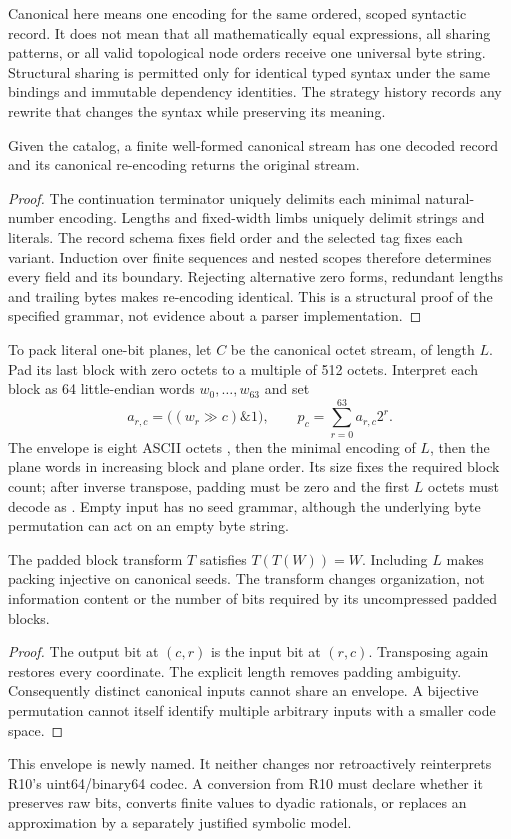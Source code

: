Canonical here means one encoding for the same ordered, scoped syntactic
record. It does not mean that all mathematically equal expressions, all sharing
patterns, or all valid topological node orders receive one universal byte string.
Structural sharing is permitted only for identical typed syntax under the same
bindings and immutable dependency identities. The strategy history records any
rewrite that changes the syntax while preserving its meaning.

\begin{proposition}
Given the catalog, a finite well-formed canonical stream has one decoded record
and its canonical re-encoding returns the original stream.
\end{proposition}
\begin{proof}
The continuation terminator uniquely delimits each minimal natural-number
encoding. Lengths and fixed-width limbs uniquely delimit strings and literals.
The record schema fixes field order and the selected tag fixes each variant.
Induction over finite sequences and nested scopes therefore determines every
field and its boundary. Rejecting alternative zero forms, redundant lengths and
trailing bytes makes re-encoding identical. This is a structural proof of the
specified grammar, not evidence about a parser implementation.
\end{proof}

To pack literal one-bit planes, let $C$ be the canonical octet stream, of length
$L$. Pad its last block with zero octets to a multiple of 512 octets. Interpret
each block as 64 little-endian words $w_0,\ldots,w_{63}$ and set
\[
 a_{r,c}=\bigl((w_r\gg c)\mathbin{\&}1\bigr),\qquad
 p_c=\sum_{r=0}^{63}a_{r,c}2^r.
\]
The envelope is eight ASCII octets , then the minimal encoding of
$L$, then the plane words in increasing block and plane order. Its size fixes
the required block count; after inverse transpose, padding must be zero and the
first $L$ octets must decode as . Empty input has no seed grammar,
although the underlying byte permutation can act on an empty byte string.

\begin{proposition}
The padded block transform $T$ satisfies $T(T(W))=W$. Including $L$ makes packing
injective on canonical seeds. The transform changes organization, not information
content or the number of bits required by its uncompressed padded blocks.
\end{proposition}
\begin{proof}
The output bit at $(c,r)$ is the input bit at $(r,c)$. Transposing again restores
every coordinate. The explicit length removes padding ambiguity. Consequently
distinct canonical inputs cannot share an envelope. A bijective permutation
cannot itself identify multiple arbitrary inputs with a smaller code space.
\end{proof}
This envelope is newly named. It neither changes nor retroactively reinterprets
R10's uint64/binary64 codec. A conversion from R10 must declare whether it
preserves raw bits, converts finite values to dyadic rationals, or replaces an
approximation by a separately justified symbolic model.

